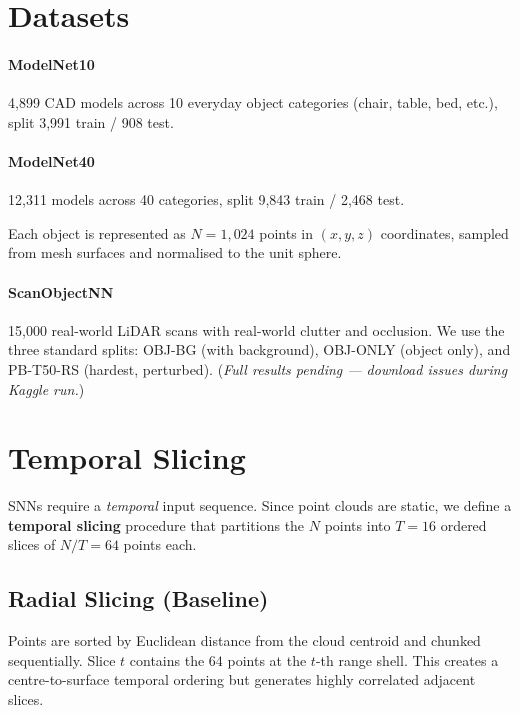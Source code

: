 \documentclass[11pt,a4paper]{article}
\begin{document}
\section{Datasets}

\paragraph{ModelNet10} 4,899 CAD models across 10 everyday object categories
(chair, table, bed, etc.), split 3,991 train / 908 test.

\paragraph{ModelNet40} 12,311 models across 40 categories, split 9,843 train /
2,468 test.

Each object is represented as $N = 1{,}024$ points in $(x,y,z)$ coordinates,
sampled from mesh surfaces and normalised to the unit sphere.

\paragraph{ScanObjectNN} 15,000 real-world LiDAR scans with real-world clutter and
occlusion. We use the three standard splits: OBJ-BG (with background),
OBJ-ONLY (object only), and PB-T50-RS (hardest, perturbed).
(\textit{Full results pending --- download issues during Kaggle run.})

\section{Temporal Slicing}

SNNs require a \emph{temporal} input sequence. Since point clouds are static,
we define a \textbf{temporal slicing} procedure that partitions the $N$ points
into $T = 16$ ordered slices of $N/T = 64$ points each.

\subsection{Radial Slicing (Baseline)}

Points are sorted by Euclidean distance from the cloud centroid and chunked
sequentially. Slice $t$ contains the $64$ points at the $t$-th range shell.
This creates a centre-to-surface temporal ordering but generates
highly correlated adjacent slices.
\end{document}
